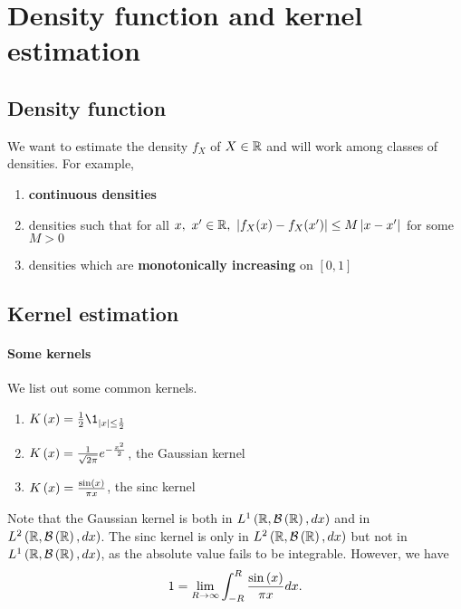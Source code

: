 \section{Density function and kernel estimation}
\subsection{Density function}
We want to estimate the density $f_X$ of $X\in \mathbb{R}$ and will work among classes of densities. For example,
\begin{enumerate}
    \item \textbf{continuous densities}
    \item densities such that for all $x,\ x'\in \mathbb{R},\ \left| f_X(x)-f_X(x')\right|\le M\left| x-x'\right|$ for some $M>0$
    \item densities which are \textbf{monotonically increasing} on $[0,1]$
\end{enumerate}

\subsection{Kernel estimation}
\paragraph{Some kernels} We list out some common kernels.
\begin{enumerate}
    \item \label{ker:rect} $K\pa{x}=\frac{1}{2}\1_{\abs{x}\le \frac{1}{2}}$
  \item\label{ker:gauss} $K\left(x\right) = \frac{1}{\sqrt{2\pi}} e^{-\frac{x^2}{2}}$, the Gaussian kernel
  \item\label{ker:sinc} $K\left(x\right) = \frac{\sin\left(x\right)}{\pi x}$, the sinc kernel
\end{enumerate}
\begin{remark}
    Note that the Gaussian kernel is both in $L^1\left(\mathbb{R},\mathcal{B}\left(\mathbb{R}\right),dx\right)$ and in $L^2\left(\mathbb{R},\mathcal{B}\left(\mathbb{R}\right),dx\right)$. The sinc kernel is only in $L^2\left(\mathbb{R},\mathcal{B}\left(\mathbb{R}\right),dx\right)$ but not in $L^1\left(\mathbb{R},\mathcal{B}\left(\mathbb{R}\right),dx\right)$, as the absolute value fails to be integrable. However, we have
\begin{equation*}
  1 = \lim_{R\rightarrow \infty}\int_{-R}^R \frac{\sin\left(x\right)}{\pi x} dx.
\end{equation*}
\end{remark}

